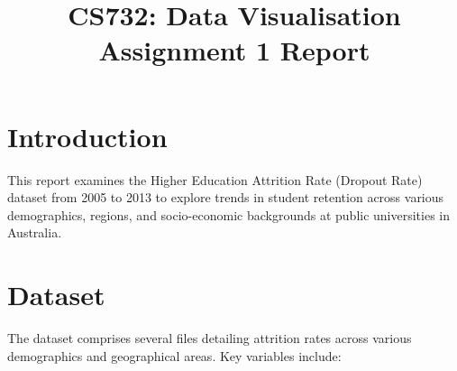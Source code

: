 \documentclass[conference]{IEEEtran}
\title{\textbf{CS732: Data Visualisation Assignment 1 Report}}
\author{\IEEEauthorblockN{Aditya Saraf}
\IEEEauthorblockA{\textit{IMT2022067} \\
\textit{Aditya.Saraf@iiitb.ac.in}}}
\begin{document}
\twocolumn

\maketitle

\section{Introduction}
This report examines the Higher Education Attrition Rate (Dropout Rate) dataset from 2005 to 2013 to explore trends in student retention across various demographics, regions, and socio-economic backgrounds at public universities in Australia.

\section{Dataset}
The dataset comprises several files detailing attrition rates across various demographics and geographical areas. Key variables include:
\end{document}
